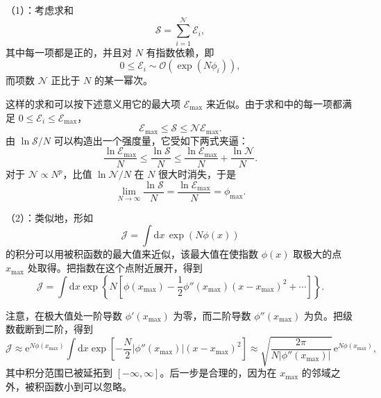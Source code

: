 （1）：考虑求和
\begin{equation}\label{eq:2.53}
  \mathscr{S}=\sum_{i=1}^{\mathscr{N}}\mathscr{E}_i,
\end{equation}
其中每一项都是正的，并且对 $N$ 有指数依赖，即
\begin{equation}\label{eq:2.54}
  0\le\mathscr{E}_i\sim\mathcal{O}\left(\exp\left(N\phi_i\right)\right),
\end{equation}
而项数 $\mathscr{N}$ 正比于 $N$ 的某一幂次。


这样的求和可以按下述意义用它的最大项 $\mathscr{E}_{\max}$ 来近似。由于求和中的每一项都满足 $0\le\mathscr{E}_i\le\mathscr{E}_{\max}$，
\begin{equation}\label{eq:2.55}
  \mathscr{E}_{\max}\le\mathscr{S}\le\mathscr{N}\mathscr{E}_{\max}.
\end{equation}
由 $\ln\mathscr{S}/N$ 可以构造出一个强度量，它受如下两式夹逼：
\begin{equation}\label{eq:2.56}
  \frac{\ln\mathscr{E}_{\max}}{N}\le\frac{\ln\mathscr{S}}{N}\le\frac{\ln\mathscr{E}_{\max}}{N}+\frac{\ln\mathscr{N}}{N}.
\end{equation}
对于 $\mathscr{N}\propto N^p$，比值 $\ln\mathscr{N}/N$ 在 $N$ 很大时消失，于是
\begin{equation}\label{eq:2.57}
  \lim_{N\to\infty}\frac{\ln\mathscr{S}}{N}=\frac{\ln\mathscr{E}_{\max}}{N}=\phi_{\max}.
\end{equation}

（2）：类似地，形如
\begin{equation}\label{eq:2.58}
  \mathscr{J}=\int\mathrm{d}x\,\exp\left(N\phi(x)\right)
\end{equation}
的积分可以用被积函数的最大值来近似，该最大值在使指数 $\phi(x)$ 取极大的点 $x_{\max}$ 处取得。把指数在这个点附近展开，得到
\begin{equation}\label{eq:2.59}
  \mathscr{J}=\int\mathrm{d}x\exp\left\{N\left[\phi(x_{\max})-\frac{1}{2}\phi''(x_{\max})(x-x_{\max})^2+\cdots\right]\right\}.
\end{equation}

注意，在极大值处一阶导数 $\phi'(x_{\max})$ 为零，而二阶导数 $\phi''(x_{\max})$ 为负。把级数截断到二阶，得到
\begin{equation}\label{eq:2.60}
  \mathscr{J}\approx\mathrm{e}^{N\phi(x_{\max})}\int\mathrm{d}x\exp\left[-\frac{N}{2}\left|\phi''(x_{\max})\right|(x-x_{\max})^2\right]\approx\sqrt{\frac{2\pi}{N\left|\phi''(x_{\max})\right|}}\,\mathrm{e}^{N\phi(x_{\max})},
\end{equation}
其中积分范围已被延拓到 $[-\infty,\infty]$。后一步是合理的，因为在 $x_{\max}$ 的邻域之外，被积函数小到可以忽略。

